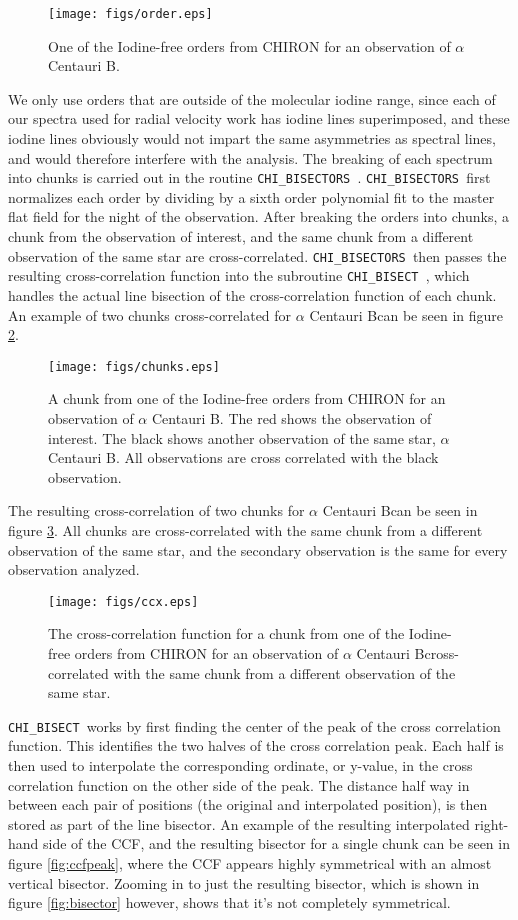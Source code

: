 \documentclass[iop]{emulateapj}
\def\cbers{\texttt{CHI\_BISECTORS~}}
\def\cbis{\texttt{CHI\_BISECT~}}
\def\acenb{$\alpha$ Centauri B}
\begin{document}
\begin{figure}[ht]
\texttt{[image: figs/order.eps]}
\caption{\label{fig:order} One of the Iodine-free orders from CHIRON for an observation of \acenb.}
\end{figure}


We only use orders that are outside of the molecular iodine range, since each of our spectra used for radial velocity work has iodine lines superimposed, and these iodine lines obviously would not impart the same asymmetries as spectral lines, and would therefore interfere with the analysis. The breaking of each spectrum into chunks is carried out in the routine \cbers. \cbers first normalizes each order by dividing by a sixth order polynomial fit to the master flat field for the night of the observation. After breaking the orders into chunks, a chunk from the observation of interest, and the same chunk from a different observation of the same star are cross-correlated. \cbers then passes the resulting cross-correlation function into the subroutine \cbis, which handles the actual line bisection of the cross-correlation function of each chunk. An example of two chunks cross-correlated for \acenb can be seen in figure \ref{fig:chunks}. 

\begin{figure}[ht]
\texttt{[image: figs/chunks.eps]}
\caption{\label{fig:chunks} A chunk from one of the Iodine-free orders from CHIRON for an observation of \acenb. The red shows the observation of interest. The black shows another observation of the same star, \acenb. All observations are cross correlated with the black observation.}
\end{figure}

The resulting cross-correlation of two chunks for \acenb can be seen in figure \ref{fig:ccx}. All chunks are cross-correlated with the same chunk from a different observation of the same star, and the secondary observation is the same for every observation analyzed.

\begin{figure}[ht]
\texttt{[image: figs/ccx.eps]}
\caption{\label{fig:ccx} The cross-correlation function for a chunk from one of the Iodine-free orders from CHIRON for an observation of \acenb cross-correlated with the same chunk from a different observation of the same star.}
\end{figure}

\cbis works by first finding the center of the peak of the cross correlation function. This identifies the two halves of the cross correlation peak. Each half is then used to interpolate the corresponding ordinate, or y-value, in the cross correlation function on the other side of the peak. The distance half way in between each pair of positions (the original and interpolated position), is then stored as part of the line bisector. An example of the resulting interpolated right-hand side of the CCF, and the resulting bisector for a single chunk can be seen in figure \ref{fig:ccfpeak}, where the CCF appears highly symmetrical with an almost vertical bisector. Zooming in to just the resulting bisector, which is shown in figure \ref{fig:bisector} however, shows that it's not completely symmetrical.
\end{document}
